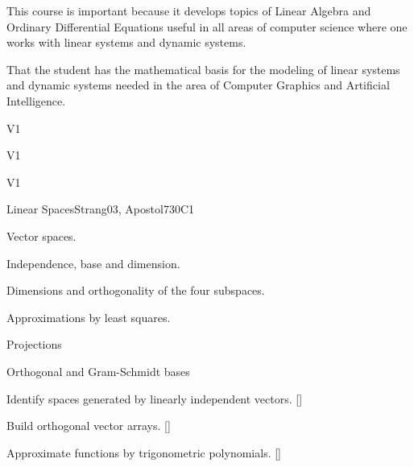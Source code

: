 \begin{syllabus}


\begin{justification}
   This course is important because it develops topics of Linear Algebra and Ordinary Differential Equations useful in all areas of computer science where one works with linear systems and dynamic systems.
\end{justification}

\begin{goals}
\item That the student has the mathematical basis for the modeling of linear systems and dynamic systems needed in the area of Computer Graphics and Artificial Intelligence.
\end{goals}

\begin{outcomes}{V1}
  \item {}
  \item {}
  \item {}
\end{outcomes}

\begin{specificoutcomes}{V1}
      \item {}
      \item {}
\end{specificoutcomes}

\begin{competences}{V1}
    \item {} 
    \item {}
    \item {}
\end{competences}

\begin{unit}{}{Linear Spaces}{Strang03, Apostol73}{0}{C1}
\begin{topics}
      \item Vector spaces.
      \item Independence, base and dimension.
      \item Dimensions and orthogonality of the four subspaces.
      \item Approximations by least squares.
      \item Projections
      \item Orthogonal and Gram-Schmidt bases
   \end{topics}
   \begin{learningoutcomes}
      \item Identify spaces generated by linearly independent vectors. [\Usage]
      \item Build orthogonal vector arrays. [\Usage]
      \item Approximate functions by trigonometric polynomials. [\Usage]
   \end{learningoutcomes}
\end{unit}


\end{syllabus}
